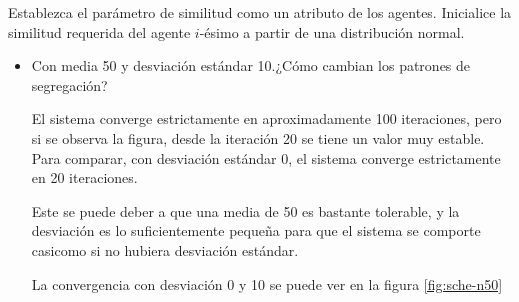 \documentclass{article}
\begin{document}
Establezca el parámetro de similitud como un atributo de los agentes. Inicialice
la similitud requerida del agente $i$-ésimo a partir de una distribución normal.

\begin{itemize}
  \item Con media 50 y desviación estándar 10.¿Cómo cambian los patrones de
    segregación?

    El sistema converge estrictamente en aproximadamente 100 iteraciones, pero
    si se observa la figura, desde la iteración 20 se tiene un valor muy
    estable. Para comparar, con desviación estándar 0, el sistema converge
    estrictamente en 20 iteraciones.

    Este se puede deber a que una media de 50 es bastante tolerable, y la
    desviación es lo suficientemente pequeña para que el sistema se comporte
    casicomo si no hubiera desviación estándar.

    La convergencia con desviación 0 y 10 se puede ver en la figura
    \ref{fig:sche-n50}


\end{itemize}
\end{document}
